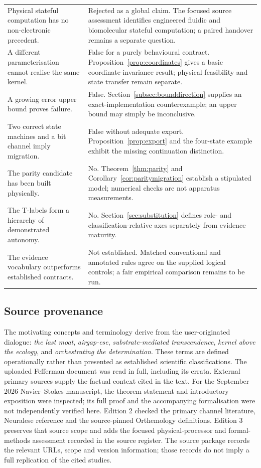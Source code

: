 \documentclass[11pt,a4paper]{article}
\theoremstyle{definition}
\theoremstyle{remark}
\begin{document}
\begin{longtable}{@{}>{\raggedright\arraybackslash}p{}>{\raggedright\arraybackslash}p{}@{}}
Physical stateful computation has no non-electronic precedent. & Rejected as a global claim. The focused source assessment identifies engineered fluidic and biomolecular stateful computation; a paired handover remains a separate question.\\
A different parameterisation cannot realise the same kernel. & False for a purely behavioural contract. Proposition~\ref{prop:coordinates} gives a basic coordinate-invariance result; physical feasibility and state transfer remain separate.\\
A growing error upper bound proves failure. & False. Section~\ref{subsec:bounddirection} supplies an exact-implementation counterexample; an upper bound may simply be inconclusive.\\
Two correct state machines and a bit channel imply migration. & False without adequate export. Proposition~\ref{prop:export} and the four-state example exhibit the missing continuation distinction.\\
The parity candidate has been built physically. & No. Theorem~\ref{thm:parity} and Corollary~\ref{cor:paritymigration} establish a stipulated model; numerical checks are not apparatus measurements.\\
The T-labels form a hierarchy of demonstrated autonomy. & No. Section~\ref{sec:substitution} defines role- and classification-relative axes separately from evidence maturity.\\
The evidence vocabulary outperforms established contracts. & Not established. Matched conventional and annotated rules agree on the supplied logical controls; a fair empirical comparison remains to be run.\\
\bottomrule
\end{longtable}
\endgroup


\subsection*{Source provenance}
The motivating concepts and terminology derive from the user-originated dialogue: \emph{the last moat}, \emph{airgap-ese}, \emph{substrate-mediated transcendence}, \emph{kernel above the ecology}, and \emph{orchestrating the determination}. These terms are defined operationally rather than presented as established scientific classifications. The uploaded Fefferman document was read in full, including its errata. External primary sources supply the factual context cited in the text. For the September 2026 Navier--Stokes manuscript, the theorem statement and introductory exposition were inspected; its full proof and the accompanying formalisation were not independently verified here. Edition 2 checked the primary channel literature, Neuralese reference and the source-pinned Orthemology definitions. Edition 3 preserves that source scope and adds the focused physical-processor and formal-methods assessment recorded in the source register. The source package records the relevant URLs, scope and version information; those records do not imply a full replication of the cited studies.
\end{document}

